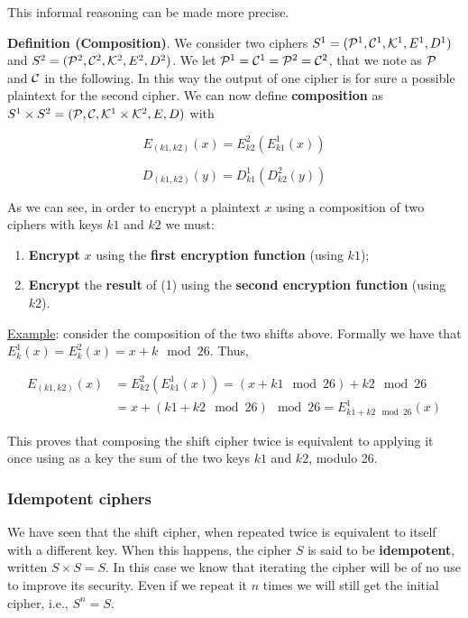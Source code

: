 This informal reasoning can be made more precise.

\textbf{Definition (Composition)}. We consider two ciphers $S^1=({\cal P}^1,{\cal C}^1,{\cal K}^1,E^1,D^1)$ and $S^2=({\cal P}^2,{\cal C}^2,{\cal K}^2,E^2,D^2)$. We let ${\cal P}^1={\cal C}^1={\cal P}^2={\cal C}^2$, that we note as ${\cal P}$ and ${\cal C}$ in the following. In this way the output of one cipher is for sure a possible plaintext for the second cipher. We can now define \textbf{composition} as $S^1 \times S^2 = ({\cal P},{\cal C},{\cal K}^1\times{\cal K}^2,E,D)$ with

$$
E_{(k1,k2)}(x) = E^2_{k2}(E^1_{k1}(x))
$$

$$
D_{(k1,k2)}(y) = D^1_{k1}(D^2_{k2}(y))
$$

As we can see, in order to encrypt a plaintext $x$ using a composition of two ciphers with keys $k1$ and $k2$ we must:

\begin{enumerate}
    \item \textbf{Encrypt} $x$ using the \textbf{first encryption function} (using $k1$);
    \item \textbf{Encrypt} the \textbf{result} of (1) using the \textbf{second encryption function} (using $k2$).
\end{enumerate}

\underline{Example}: consider the composition of the two shifts above. Formally we have that $E^1_k(x) = E^2_k(x) = x+k \mod 26$. Thus,

\begin{equation}
    \begin{align*}
        E_{(k1,k2)}(x) &= E^2_{k2}(E^1_{k1}(x)) = (x + k1 \mod 26) + k2 \mod 26\\ 
        &= x + (k1+k2 \mod 26) \mod 26 = E^1_{k1+k2 \mod 26}(x)
    \end{align*}
\end{equation}

This proves that composing the shift cipher twice is equivalent to applying it once using as a key the sum of the two keys $k1$ and $k2$, modulo 26.

\subsubsection{Idempotent ciphers}
We have seen that the shift cipher, when repeated twice is equivalent to itself with a different key. When this happens, the cipher $S$ is said to be \textbf{idempotent}, written $S \times S = S$. In this case we know that iterating the cipher will be of no use to improve its security. Even if we repeat it $n$ times we will still get the initial cipher, i.e., $S^n = S$.

